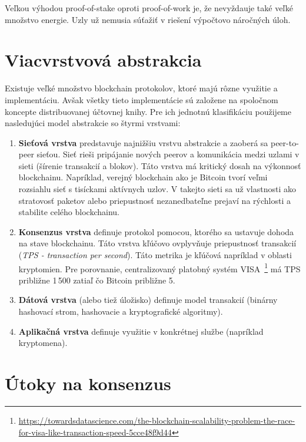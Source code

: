 Veľkou výhodou proof-of-stake oproti proof-of-work je, že nevyždauje také veľké množstvo energie. Uzly už nemusia súťažiť v riešení výpočtovo náročných úloh. ~\cite{leporeConsensus}

\chapter{Viacvrstvová abstrakcia}

Existuje veľké množstvo blockchain protokolov, ktoré majú rôzne využitie a implementáciu. Avšak všetky tieto implementácie sú založene na spoločnom koncepte distribuovanej účtovnej knihy. Pre ich jednotnú klasifikáciu použijeme nasledujúci model abstrakcie so štyrmi vrstvami:~\cite{homoliakBlockchain}

\begin{enumerate}
	\item \textbf{Sieťová vrstva} predstavuje najnižšiu vrstvu abstrakcie a zaoberá sa peer-to-peer sieťou. Sieť rieši pripájanie nových peerov a komunikácia medzi uzlami v sieti (šírenie transakcií a blokov). Táto vrstva má kritický dosah na výkonnosť blockchainu. Napríklad, verejný blockchain ako je Bitcoin tvorí veľmi rozsiahlu sieť s tisíckami aktívnych uzlov. V takejto sieti sa už vlastnosti ako stratovosť paketov alebo priepustnosť nezanedbateľne prejaví na rýchlosti a stabilite celého blockchainu.~\cite{fanPerfEval}
	\item \textbf{Konsenzus vrstva} definuje protokol pomocou, ktorého sa ustavuje dohoda na stave blockchainu. Táto vrstva kľúčovo ovplyvňuje priepustnosť transakcií (\textit{TPS - transaction per second}). Táto metrika je kľúčová napríklad v oblasti kryptomien. Pre porovnanie, centralizovaný platobný systém VISA~\footnote{\url{https://towardsdatascience.com/the-blockchain-scalability-problem-the-race-for-visa-like-transaction-speed-5cce48f9d44}} má TPS približne 1\,500 zatiaľ čo Bitcoin približne 5.
	\item \textbf{Dátová vrstva} (alebo tiež úložisko) definuje model transakcií (binárny hashovací strom, hashovacie a kryptografické algoritmy).
	\item \textbf{Aplikačná vrstva} definuje využitie v konkrétnej službe (napríklad kryptomena).
\end{enumerate}

\chapter{Útoky na konsenzus}

